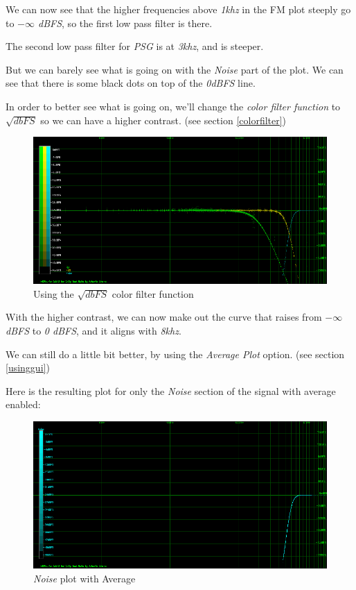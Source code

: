 \documentclass[10pt,a4paper]{report}
\begin{document}
We can now see that the higher frequencies above \textit{1khz} in the FM plot steeply go to \textit{$-\infty$ dBFS}, so the first low pass filter is there.

The second low pass filter for \textit{PSG} is at \textit{3khz}, and is steeper.

But we can barely see what is going on with the \textit{Noise} part of the plot. We can see that there is some black dots on top of the \textit{0dBFS} line.

In order to better see what is going on, we'll change the \textit{color filter function} to $\sqrt{dbFS}$ so we can have a higher contrast. (see section \ref{colorfilter})

\begin{figure}[H]
	\centering
	\includegraphics[width=1.0\linewidth]{plots/Plot4-2-All-sqrt.png}
	\caption[Using SQRT]{Using the $\sqrt{dbFS}$ color filter function}
	\label{fig:plot4-2-all-sqrt}
\end{figure}

With the higher contrast, we can now make out the curve that raises from \textit{$-\infty$ dBFS} to \textit{0 dBFS}, and it aligns with \textit{8khz}.

We can still do a little bit better, by using the \textit{Average Plot} option. (see section \ref{usinggui})

Here is the resulting plot for only the \textit{Noise} section of the signal with average enabled:

\begin{figure}[H]
	\centering
	\includegraphics[width=1.0\linewidth]{plots/Plot4-3-AVG-Noise.png}
	\caption[Noise Average]{\textit{Noise} plot with Average}
	\label{fig:plot4-3-avg-noise}
\end{figure}
\end{document}
